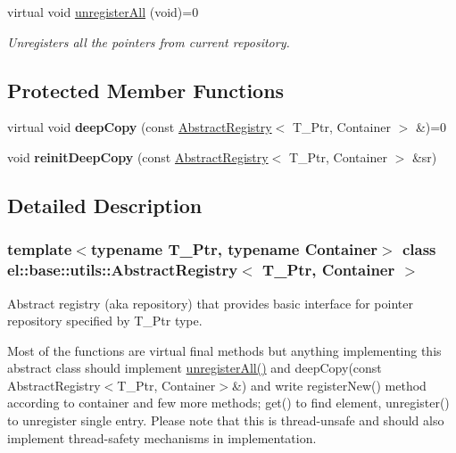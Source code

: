 \begin{DoxyCompactItemize}
\mbox{\label{classel_1_1base_1_1utils_1_1_abstract_registry_a19223bc1fea48dbe6b47b4879aa4672f}} 
virtual void \hyperlink{classel_1_1base_1_1utils_1_1_abstract_registry_a19223bc1fea48dbe6b47b4879aa4672f}{unregister\+All} (void)=0
\begin{DoxyCompactList}\small\item\em Unregisters all the pointers from current repository. \end{DoxyCompactList}\end{DoxyCompactItemize}
\subsection*{Protected Member Functions}
\begin{DoxyCompactItemize}
\item 
\mbox{\label{classel_1_1base_1_1utils_1_1_abstract_registry_aaf42dab7089a9b1198e2920983ca82bb}} 
virtual void {\bfseries deep\+Copy} (const \hyperlink{classel_1_1base_1_1utils_1_1_abstract_registry}{Abstract\+Registry}$<$ T\+\_\+\+Ptr, Container $>$ \&)=0
\item 
\mbox{\label{classel_1_1base_1_1utils_1_1_abstract_registry_a529677fb42e78d03c36cdea49f8877c9}} 
void {\bfseries reinit\+Deep\+Copy} (const \hyperlink{classel_1_1base_1_1utils_1_1_abstract_registry}{Abstract\+Registry}$<$ T\+\_\+\+Ptr, Container $>$ \&sr)
\end{DoxyCompactItemize}


\subsection{Detailed Description}
\subsubsection*{template$<$typename T\+\_\+\+Ptr, typename Container$>$\newline
class el\+::base\+::utils\+::\+Abstract\+Registry$<$ T\+\_\+\+Ptr, Container $>$}

Abstract registry (aka repository) that provides basic interface for pointer repository specified by T\+\_\+\+Ptr type. 

Most of the functions are virtual final methods but anything implementing this abstract class should implement \hyperlink{classel_1_1base_1_1utils_1_1_abstract_registry_a19223bc1fea48dbe6b47b4879aa4672f}{unregister\+All()} and deep\+Copy(const Abstract\+Registry$<$\+T\+\_\+\+Ptr, Container$>$\&) and write register\+New() method according to container and few more methods; get() to find element, unregister() to unregister single entry. Please note that this is thread-\/unsafe and should also implement thread-\/safety mechanisms in implementation. 

